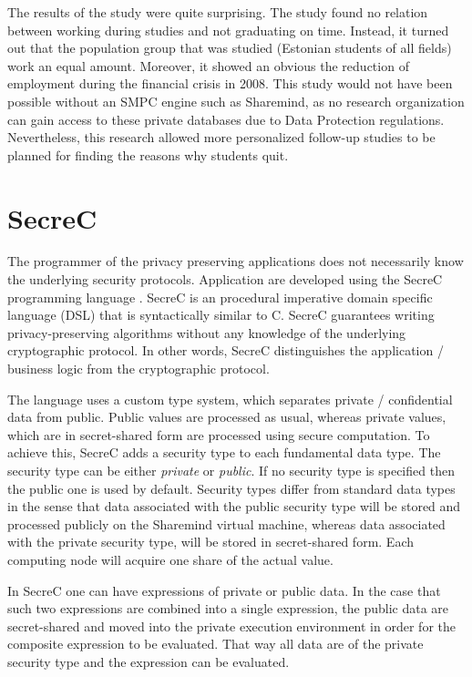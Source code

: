 The results of the study were quite surprising.
The study found no relation between working during studies and not graduating on time.
Instead, it turned out that the population group that was studied (Estonian students of all fields) work an equal amount.
Moreover, it showed an obvious the reduction of employment during the financial crisis in 2008.
This study would not have been possible without an SMPC engine such as Sharemind, as no research organization can gain access to these private databases due to Data Protection regulations.
Nevertheless, this research allowed more personalized follow-up studies to be planned for finding the reasons why students quit.



\section{SecreC}\label{s:secrec}

The programmer of the privacy preserving applications does not necessarily know the underlying security protocols.
Application are developed using the SecreC programming language \cite{jagomagis2010secrec}.
SecreC is an procedural imperative domain specific language (DSL) that is syntactically similar to C. SecreC guarantees writing privacy-preserving algorithms without any knowledge of the underlying cryptographic protocol.
In other words, SecreC distinguishes the application / business logic from the cryptographic protocol.

The language uses a custom type system, which separates private / confidential data from public.
Public values are processed as usual, whereas private values, which are in secret-shared form are processed using secure computation.
To achieve this, SecreC adds a security type to each fundamental data type.
The security type can be either \textit{private} or \textit{public}.
If no security type is specified then the public one is used by default.
Security types differ from standard data types in the sense that data associated with the public security type will be stored and processed publicly on the Sharemind virtual machine, whereas data associated with the private security type, will be stored in secret\hyp shared form.
Each computing node will acquire one share of the actual value.

In SecreC one can have expressions of private or public data.
In the case that such two expressions are combined into a single expression, the public data are secret\hyp shared and moved into the private execution environment in order for the composite expression to be evaluated.
That way all data are of the private security type and the expression can be evaluated.

